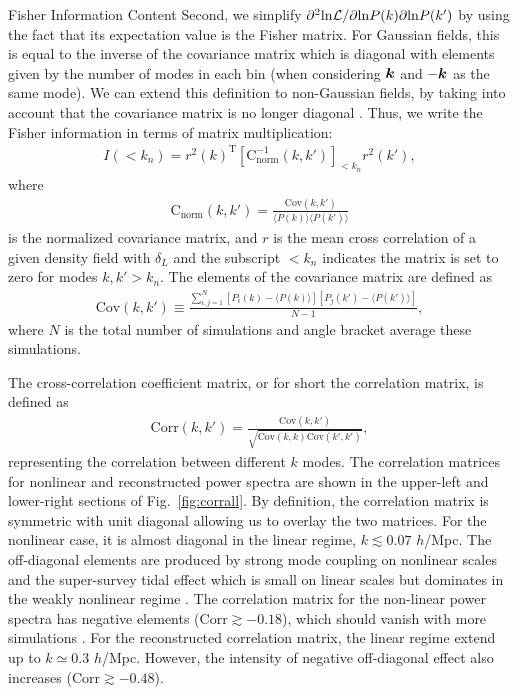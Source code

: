 \begin{section}{Fisher Information Content}
  Second, we simplify
  $\partial ^2 \mathrm{ln \mathcal{L}}/\partial \mathrm{ln} P(k) \partial
  \mathrm{ln} P(k')$
  by using the fact that its expectation value is the Fisher
  matrix.  For Gaussian fields, this is equal to the inverse of the
  covariance matrix which is diagonal with elements given by the
  number of modes in each bin (when considering $\boldsymbol{k}$ and $-\boldsymbol{k}$ as the same mode).  
  We can extend this definition to
  non-Gaussian fields, by taking into account that the covariance
  matrix is no longer diagonal .  Thus, we
  write the Fisher information in terms of matrix multiplication:
  \begin{align}
    I \left( < k_n\right) = r^2(k)^{\mathrm{T}} \left[ \mathrm{C^{-1}_{norm}} 
    ( k,k' )\right]_{<k_n} r^2(k') ,
    \label{eq:fisherformulaused}
  \end{align}
  where
  \begin{align}
    \mathrm{C_{norm}} \left( k,k' \right)=\frac{\mathrm{Cov}(k,k')}
    {\langle P(k)\rangle\langle P(k')\rangle}
  \end{align}
  is the normalized covariance matrix, and
  $r$ is the mean cross correlation of a given density field with
  $\delta_L$ and the subscript $<k_n$ indicates the matrix is set to
  zero for modes $k,k'>k_n$.  The elements of the covariance matrix are defined as
  \begin{align}
    \mathrm{Cov}\left(k,k'\right)\equiv \frac{\sum_{i,j=1}^{N}\left[ P_i \left( k \right) - 
    \langle P \left( k \right) \rangle \right]\left[ P_j \left( k' \right) - 
    \langle P \left( k' \right)\rangle \right]}{N-1},
  \end{align}
  where $N$ is the total number of simulations and angle bracket average these simulations.  

  The cross-correlation coefficient matrix, or for short the correlation matrix, 
  is defined as 
  \begin{align}
    \mathrm{Corr}\left(k,k'\right)=\frac{\mathrm{Cov}\left(k,k'\right)}
    {\sqrt{\mathrm{Cov}\left(k,k\right)\mathrm{Cov}\left(k',k'\right)}},
  \end{align}
  representing the correlation between different $k$ modes.  The
  correlation matrices for nonlinear and reconstructed power spectra
  are shown in the upper-left and lower-right sections of Fig.~\ref{fig:corrall}.
  By definition, the correlation matrix is symmetric with unit
  diagonal allowing us to overlay the two matrices.  For the
  nonlinear case, it is almost diagonal in the linear
  regime, $k \lesssim 0.07$ $h$/Mpc.  The off-diagonal
  elements are produced by strong mode coupling on nonlinear scales
  and the super-survey tidal effect which is small on linear scales
  but dominates in the weakly nonlinear regime
  \cite{bib:Kazuyuki2016}.  The correlation matrix for the non-linear
  power spectra has negative elements
  ($\mathrm{Corr} \gtrsim -0.18$), which should vanish with more
  simulations \cite{bib:Takahashi2009}.  For the reconstructed
  correlation matrix, the linear regime extend up to $k \simeq 0.3$
  $h$/Mpc.  However, the intensity of negative off-diagonal effect
  also increases ($\mathrm{Corr} \gtrsim -0.48$).


\end{section}
